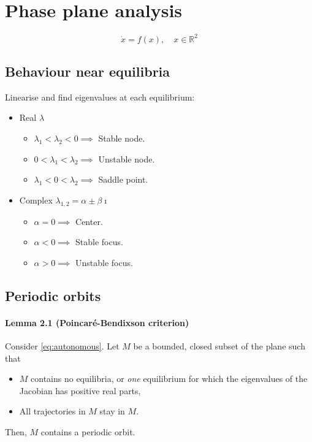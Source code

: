 \section{Phase plane analysis}
\begin{equation}\label{eq:autonomous}
	\dot{x} = f(x), \quad x \in \mathbb{R}^2
\end{equation}

\subsection{Behaviour near equilibria}
Linearise and find eigenvalues at each equilibrium:
\begin{itemize}
	\item Real $\lambda$
	\begin{itemize}
		\item $\lambda_1 < \lambda_2 < 0 \implies$ Stable node.
		\item $0 < \lambda_1 < \lambda_2 \implies$ Unstable node.
		\item $\lambda_1 < 0 < \lambda_2 \implies$ Saddle point.
	\end{itemize}
	\item Complex $\lambda_{1,2} = \alpha \pm \beta \imath$
	\begin{itemize}
		\item $\alpha = 0 \implies$ Center.
		\item $\alpha < 0 \implies$ Stable focus.
		\item $\alpha > 0 \implies$ Unstable focus.
	\end{itemize}
\end{itemize}

\subsection{Periodic orbits}
\paragraph{Lemma 2.1 (Poincaré-Bendixson criterion)}
Consider \eqref{eq:autonomous}. Let $M$ be a bounded, closed subset of the plane such that
\begin{itemize}
	\item $M$ contains no equilibria, or \emph{one} equilibrium for which the eigenvalues of the Jacobian has positive real parts,
	\item All trajectories in $M$ stay in $M$.
\end{itemize}
Then, $M$ contains a periodic orbit.

